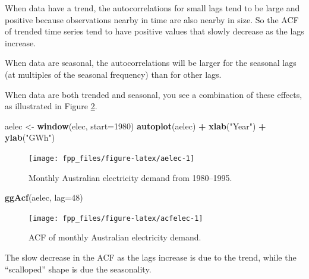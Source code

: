 \documentclass[]{book}
\newenvironment{Shaded}{\begin{snugshade}}{\end{snugshade}}
\newcommand{\DataTypeTok}[1]{\textcolor[rgb]{0.13,0.29,0.53}{#1}}
\newcommand{\DecValTok}[1]{\textcolor[rgb]{0.00,0.00,0.81}{#1}}
\newcommand{\KeywordTok}[1]{\textcolor[rgb]{0.13,0.29,0.53}{\textbf{#1}}}
\newcommand{\NormalTok}[1]{#1}
\newcommand{\OperatorTok}[1]{\textcolor[rgb]{0.81,0.36,0.00}{\textbf{#1}}}
\newcommand{\StringTok}[1]{\textcolor[rgb]{0.31,0.60,0.02}{#1}}
\begin{document}
When data have a trend, the autocorrelations for small lags tend to be large and positive because observations nearby in time are also nearby in size. So the ACF of trended time series tend to have positive values that slowly decrease as the lags increase.

When data are seasonal, the autocorrelations will be larger for the seasonal lags (at multiples of the seasonal frequency) than for other lags.

When data are both trended and seasonal, you see a combination of these effects, as illustrated in Figure \ref{fig:acfelec}.

\begin{Shaded}
\begin{Highlighting}[]
\NormalTok{aelec <-}\StringTok{ }\KeywordTok{window}\NormalTok{(elec, }\DataTypeTok{start=}\DecValTok{1980}\NormalTok{)}
\KeywordTok{autoplot}\NormalTok{(aelec) }\OperatorTok{+}\StringTok{ }\KeywordTok{xlab}\NormalTok{(}\StringTok{"Year"}\NormalTok{) }\OperatorTok{+}\StringTok{ }\KeywordTok{ylab}\NormalTok{(}\StringTok{"GWh"}\NormalTok{)}
\end{Highlighting}
\end{Shaded}

\begin{figure}

{\centering \texttt{[image: fpp\_files/figure-latex/aelec-1]} 

}

\caption{Monthly Australian electricity demand from 1980--1995.}\label{fig:aelec}
\end{figure}

\begin{Shaded}
\begin{Highlighting}[]
\KeywordTok{ggAcf}\NormalTok{(aelec, }\DataTypeTok{lag=}\DecValTok{48}\NormalTok{)}
\end{Highlighting}
\end{Shaded}

\begin{figure}

{\centering \texttt{[image: fpp\_files/figure-latex/acfelec-1]} 

}

\caption{ACF of monthly Australian electricity demand.}\label{fig:acfelec}
\end{figure}

The slow decrease in the ACF as the lags increase is due to the trend, while the ``scalloped'' shape is due the seasonality.
\end{document}
